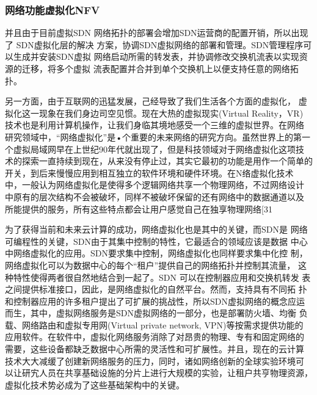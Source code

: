 \subsubsection{网络功能虚拟化NFV}



并且由于目前虚拟SDN 网络拓扑的部署会增加SDN运营商的配置开销，所以出现了 SDN虚拟化层的解决 方案，协调SDN虚拟网络的部署和管理。SDN管理程序可以生成并安装SDN虚拟 网络启动所需的转发表，并协调修改交换机流表以实现资源的迁移，将多个虚拟 流表配置并合并到单个交换机上以便支持任意的网络拓扑。


另一方面，由于互联网的迅猛发展，己经导致了我们生活各个方面的虚拟化， 虚拟化这一现象在我们身边司空见惯。现在大热的虚拟现实(Virtual Reality，VR) 技术也是利用计算机操作，让我们身临其境地感受一个三维的虚拟世界。在网络 研究领域中，“网络虚拟化”是•个重要的未来网络的研究方向。虽然世界上的第一 个虚拟局域网早在上世纪90年代就出现了，但是科技领域对于网络虚拟化这项技 术的探索一直持续到现在，从来没有停止过，其实它最初的功能是用作一个简单的开关，到后来慢慢应用到相互独立的软件环境和硬件环境。在N络虚拟化技术 中，一般认为网络虚拟化是使得多个逻辑网络共享一个物理网络，不过网络设计 中原有的层次结构不会被破坏，同样不被破坏保留的还有网络中的数据通道以及 所能提供的服务，所有这些特点都会让用户感觉自己在独享物理网络[31

为了获得当前和未来云计算的成功，网络虚拟化也是其中的关键，而SDN是 网络可编程性的关键，SDN由于其集中控制的特性，它最适合的领域应该是数据 中心中网络虚拟化的应用。SDN要求集中控制，网络虚拟化也同样要求集中化控 制，网络虚拟化可以为数据中心的每个“租户”提供自己的网络拓扑并控制其流量， 这种特性使得两者很自然地结合到一起了。SDN 可以在控制器应用和交换机转发 表之间提供标准接口，因此，是网络虚拟化的自然平台。然而，支持具有不同拓 扑和控制器应用的许多租户提出了可扩展的挑战性，所以SDN虚拟网络的概念应运而生，其中，虚拟网络服务是SDN虚拟网络的一部分，也是部署防火墙、均衡 负载、网络路由和虚拟专用网(Virtual private network, VPN)等按需求提供功能的 应用软件。在软件中，虚拟化网络服务消除了对昂贵的物理、专有和固定网络的 需要，这些设备都缺乏数据中心所需的灵活性和可扩展性。并且，现在的云计算 技术大大减缓了创建新网络服务的压力，同时，诸如网络创新的全球实验环境可 以让研宄人员在共享基础设施的分片上进行大规模的实验，让租户共亨物理资源， 虚拟化技术势必成为了这些基础架构中的关键。

